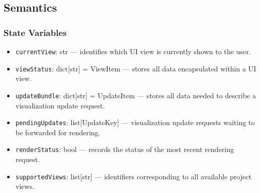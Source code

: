 \documentclass[12pt, titlepage]{article}
\begin{document}

\subsection{Semantics}

\subsubsection{State Variables}
\begin{itemize}
  \item \texttt{currentView}: str — identifies which UI view is currently shown to the user.
  \item \texttt{viewStatus}: dict[str] = ViewItem — stores all data encapsulated within a UI view.
  \item \texttt{updateBundle}: dict[str] = UpdateItem — stores all data needed to describe a visualization update request.
  \item \texttt{pendingUpdates}: list[UpdateKey] — visualization update requests waiting to be forwarded for rendering.
  \item \texttt{renderStatus}: bool — records the status of the most recent rendering request.
  \item \texttt{supportedViews}: list[str] — identifiers corresponding to all available project views.
\end{itemize}
\end{document}
